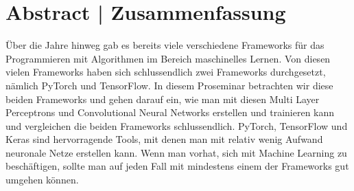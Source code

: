 \section*{Abstract | Zusammenfassung}
Über die Jahre hinweg gab es bereits viele verschiedene Frameworks für das Programmieren 
mit Algorithmen im Bereich maschinelles Lernen. Von diesen vielen Frameworks 
haben sich schlussendlich zwei Frameworks durchgesetzt, nämlich PyTorch und TensorFlow. 
In diesem Proseminar betrachten wir diese beiden Frameworks und gehen darauf ein, 
wie man mit diesen Multi Layer Perceptrons und Convolutional Neural Networks 
erstellen und trainieren kann und vergleichen die beiden Frameworks schlussendlich.
PyTorch, TensorFlow und Keras sind hervorragende Tools, mit denen man mit 
relativ wenig Aufwand neuronale Netze erstellen kann. Wenn man vorhat, sich 
mit Machine Learning zu beschäftigen, sollte man auf jeden Fall mit mindestens einem der 
Frameworks gut umgehen können.